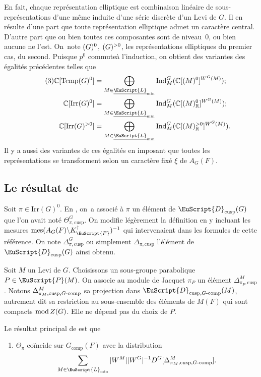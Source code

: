 \documentclass[JEP,XML,SOM,Unicode,francais]{cedram}
\let\mathcal \EuScript
\newcommand{\NoChangel}[1]{%
\expandafter\let\csname old\string#1\endcsname=#1
\let#1=\relax
\newcommand{#1}{\mathcode`l="716C\csname old\string#1\endcsname\mathcode`l="7160 }%
}
\newcommand{\rmod}{\textup{mod}\,}
\newcommand{\comp}{\mathrm{comp}}
\newcommand{\tcomp}{\textup{-comp}}
\newcommand{\cusp}{\mathrm{cusp}}
\newcommand{\Ell}{\mathrm{Ell}} \NoChangel{\Ell}
\newcommand{\Ind}{\mathrm{Ind}}
\newcommand{\Irr}{\mathrm{Irr}}
\newcommand{\Temp}{\mathrm{Temp}}
\DeclareMathOperator{\mes}{mes}
\newcommand{\cD}{\mathcal{D}}
\newcommand{\cF}{\mathcal{F}}
\newcommand{\cL}{\mathcal{L}}
\newcommand{\cP}{\mathcal{P}}
\newcommand{\CC}{\mathbb{C}}
\newcommand{\RR}{\mathbb{R}}
\theoremstyle{plain}
\theoremstyle{definition}
\begin{document}
En fait, chaque représentation elliptique est combinaison linéaire de sous-repré\-sen\-tations d'une même induite d'une série discrète d'un Levi de $G$. Il en résulte d'une part que toute représentation elliptique admet un caractère central. D'autre part que ou bien toutes ces composantes sont de niveau~$0$, ou bien aucune ne l'est. On~note $\Ell(G)^0$, \resp $\Ell(G)^{>0}$, les représentations elliptiques du premier cas, \resp du second. Puisque $p^0$ \og commute\fg à l'induction, on obtient des variantes des égalités précédentes telles que
\begin{align*}\tag{3}\label{representationselliptiques3}
\CC[\Temp(G)^0]&=\bigoplus_{M\in\underline{\cL}_{\min}}\Ind_{M}^G(\CC[\Ell(M)^0]^{W^G(M)});\\\CC[\Irr(G)^0]&=\bigoplus_{M\in\underline{\cL}_{\min}}\Ind_{M}^G(\CC[\Ell(M)^0_{\RR}]^{W^G(M)});\\
\CC[\Irr(G)^{>0}]&=\bigoplus_{M\in\underline{\cL}_{\min}}\Ind_{M}^G(\CC[\Ell(M)_{\RR}^{>0}]^{W^G(M)}).
\end{align*}
Il y a aussi des variantes de ces égalités en imposant que toutes les représentations se transforment selon un caractère fixé $\xi$ de $A_{G}(F)$.

\subsection{Le résultat de \texorpdfstring{\cite{W2}}{W2}}\label{leresultat}

Soit $\pi\in \Irr(G)^0$. En \cite{W2}, on~a associé à $\pi$ un élément de $ \cD_{\cusp}(G)$ que l'on avait noté $\Theta^G_{\pi,\cusp}$. On modifie légèrement la définition en y incluant les mesures $\mes(A_{G}(F)\backslash K_{\cF}^{\dag})^{-1}$ qui intervenaient dans les formules de cette référence. On note $\Delta^G_{\pi,\cusp}$ ou simplement $\Delta_{\pi,\cusp}$ l'élément de $\cD_{\cusp}(G)$ ainsi obtenu.

Soit $M$ un Levi de $G$. Choisissons un sous-groupe parabolique $P\in \cP(M)$. On associe au module de Jacquet $\pi_{P}$ un élément $\Delta^M_{\pi_{P},\cusp}$. Notons $\Delta^M_{\pi_{M},\cusp,G\tcomp}$ sa projection dans $\cD_{\cusp,G\tcomp}(M)$, autrement dit sa restriction au sous-ensemble des éléments de $M(F)$ qui sont compacts $\rmod Z(G)$. Elle ne dépend pas du choix de $P$.

Le résultat principal de \cite{W2} est que
\begin{enumerate}
\item\label{leresultat1}
$\Theta_{\pi}$ coïncide sur $G_{\comp}(F)$ avec la distribution
\[
\sum_{M\in \cL_{\min}}\vert W^M\vert \vert W^G\vert ^{-1}D^G[\Delta^M_{\pi_{M},\cusp,G\tcomp}].
\]
\end{enumerate}
\end{document}

